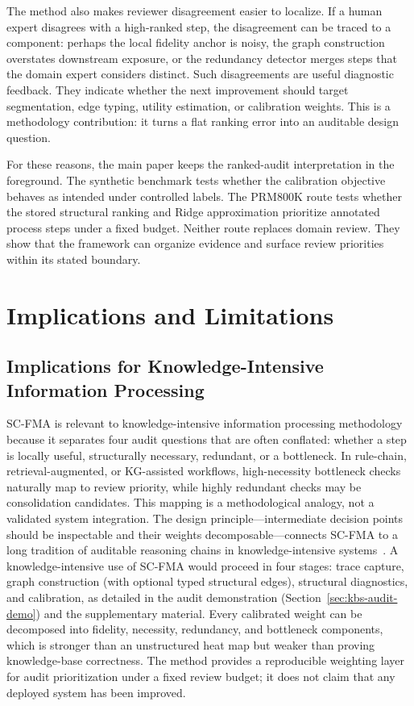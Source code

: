 \documentclass[a4paper,fleqn]{cas-sc}
\begin{document}
The method also makes reviewer disagreement easier to localize. If a human expert disagrees with a high-ranked step, the disagreement can be traced to a component: perhaps the local fidelity anchor is noisy, the graph construction overstates downstream exposure, or the redundancy detector merges steps that the domain expert considers distinct. Such disagreements are useful diagnostic feedback. They indicate whether the next improvement should target segmentation, edge typing, utility estimation, or calibration weights. This is a methodology contribution: it turns a flat ranking error into an auditable design question.

For these reasons, the main paper keeps the ranked-audit interpretation in the foreground. The synthetic benchmark tests whether the calibration objective behaves as intended under controlled labels. The PRM800K route tests whether the stored structural ranking and Ridge approximation prioritize annotated process steps under a fixed budget. Neither route replaces domain review. They show that the framework can organize evidence and surface review priorities within its stated boundary.

\section{Implications and Limitations}
\label{sec:kbs-implications}

\subsection{Implications for Knowledge-Intensive Information Processing}

SC-FMA is relevant to knowledge-intensive information processing methodology because it separates four audit questions that are often conflated: whether a step is locally useful, structurally necessary, redundant, or a bottleneck. In rule-chain, retrieval-augmented, or KG-assisted workflows, high-necessity bottleneck checks naturally map to review priority, while highly redundant checks may be consolidation candidates. This mapping is a methodological analogy, not a validated system integration. The design principle---intermediate decision points should be inspectable and their weights decomposable---connects SC-FMA to a long tradition of auditable reasoning chains in knowledge-intensive systems~\cite{buchanan1984mycin,laird2012soar}. A knowledge-intensive use of SC-FMA would proceed in four stages: trace capture, graph construction (with optional typed structural edges), structural diagnostics, and calibration, as detailed in the audit demonstration (Section~\ref{sec:kbs-audit-demo}) and the supplementary material. Every calibrated weight can be decomposed into fidelity, necessity, redundancy, and bottleneck components, which is stronger than an unstructured heat map but weaker than proving knowledge-base correctness. The method provides a reproducible weighting layer for audit prioritization under a fixed review budget; it does not claim that any deployed system has been improved.
\end{document}
